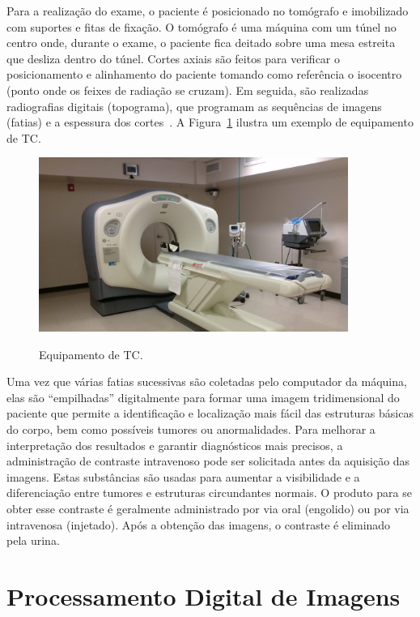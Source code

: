 Para a realização do exame, o paciente é posicionado no tomógrafo e imobilizado com suportes e fitas de fixação. O tomógrafo é uma máquina com um túnel no centro onde, durante o exame, o paciente fica deitado sobre uma mesa estreita que desliza dentro do túnel. Cortes axiais são feitos para verificar o posicionamento e alinhamento do paciente tomando como referência o isocentro (ponto onde os feixes de radiação se cruzam). Em seguida, são realizadas radiografias digitais (topograma), que programam as sequências de imagens (fatias) e a espessura dos cortes~\cite{Buzug2011,gwynne2012image}. A Figura~\ref{fig:equipamentoCT} ilustra um exemplo de equipamento de TC.

\begin{figure}[!ht]
    \centering
    \caption{Equipamento de TC.}
    \includegraphics[width=0.9\textwidth]{figuras/equipamento-CT.jpg}
    \label{fig:equipamentoCT}
\end{figure}

Uma vez que várias fatias sucessivas são coletadas pelo computador da máquina, elas são “empilhadas” digitalmente para formar uma imagem tridimensional do paciente que permite a identificação e localização mais fácil das estruturas básicas do corpo, bem como possíveis tumores ou anormalidades. Para melhorar a interpretação dos resultados e garantir diagnósticos mais precisos, a administração de contraste intravenoso pode ser solicitada antes da aquisição das imagens. Estas substâncias são usadas para aumentar a visibilidade e a diferenciação entre tumores e estruturas circundantes normais. O produto para se obter esse contraste é geralmente administrado por via oral (engolido) ou por via intravenosa (injetado). Após a obtenção das imagens, o contraste é eliminado pela urina.

\section{Processamento Digital de Imagens}
\label{sec:processamento-digital-imagens}

